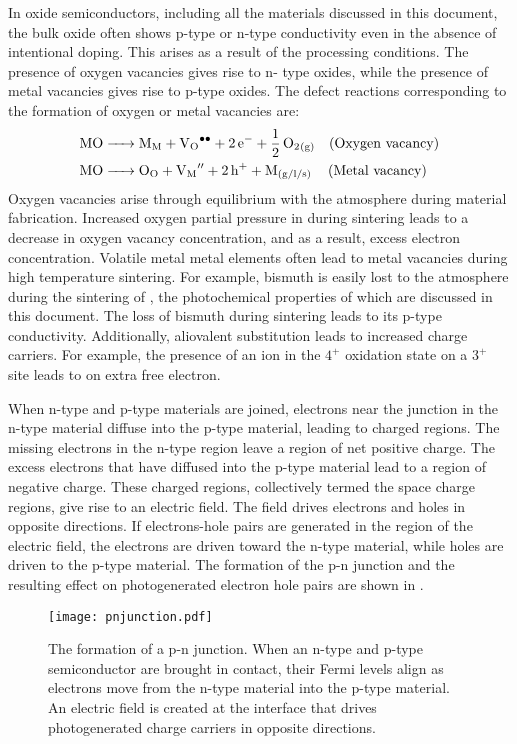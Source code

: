 In oxide semiconductors, including all the materials discussed in this 
document, the bulk oxide often shows p-type or n-type conductivity even in 
the absence of intentional doping. This arises as a result of the 
processing conditions. The presence of oxygen vacancies gives rise to n-
type oxides, while the presence of metal vacancies gives rise to p-type 
oxides. The defect reactions corresponding to the formation of oxygen or 
metal vacancies are:
\begin{align}
	\ce{MO}&\ce{-> M_M + V_O^{\bullet\bullet} + 2e- + 1/2O2_{(g)}%
	 	\hspace{1em}\text{(Oxygen~vacancy)}} \\
	\ce{MO}&\ce{-> O_O + V_M^{$\prime\prime$} + 2h+ + M_{(g/l/s)} %
		\hspace{1em}\text{(Metal~vacancy)}}
\end{align}
Oxygen vacancies arise through equilibrium with the atmosphere during 
material fabrication. Increased oxygen partial pressure in during sintering 
leads to a decrease in oxygen vacancy concentration, and as a result, 
excess electron concentration. Volatile metal metal elements often lead to 
metal vacancies during high temperature sintering. For example, bismuth is 
easily lost to the atmosphere during the sintering of , the 
photochemical properties of which are discussed in this document. The loss 
of bismuth during sintering leads to its p-type conductivity. Additionally, 
aliovalent substitution leads to increased charge carriers. For example, 
the presence of an ion in the $4^{+}$ oxidation state on a $3^{+}$ site 
leads to on extra free electron.

When n-type and p-type materials are joined, electrons near the junction in 
the n-type material diffuse into the p-type material, leading to charged 
regions. The missing electrons in the n-type region leave a region of net 
positive charge. The excess electrons that have diffused into the p-type 
material lead to a region of  negative charge. These charged regions, 
collectively termed the space charge regions, give rise to an electric 
field. The field drives electrons and holes in opposite directions. If 
electrons-hole pairs are generated in the region of the electric field, the 
electrons are driven toward the n-type material, while holes are driven to 
the p-type material. The formation of the p-n junction and the resulting 
effect on photogenerated electron hole pairs are shown in 
.

\begin{figure}
	\centering
	\texttt{[image: pnjunction.pdf]}
	\caption[The formation of a p-n junction]{%
		The formation of a p-n junction. When an n-type and p-type 
		semiconductor are brought in contact, their Fermi levels 
		align as electrons move from the n-type material into the 
		p-type material. An electric field is created at the 
		interface that drives photogenerated charge carriers in 
		opposite directions.}
	\label{fig:pnjunction}
\end{figure}

